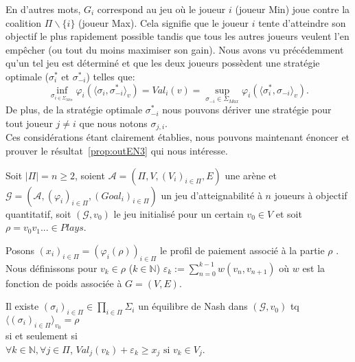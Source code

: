 En d'autres mots, $G_i$ correspond au jeu où le joueur $i$ (joueur Min) joue contre la coalition $\Pi\backslash\{ i \}$ (joueur Max). Cela signifie que le joueur $i$ tente d'atteindre son objectif le plus rapidement possible tandis que tous les autres joueurs veulent l'en empêcher (ou tout du moins maximiser son gain). Nous avons vu précédemment qu'un tel jeu est déterminé et que les deux joueurs possèdent une stratégie optimale ($\sigma^*_i$ et $\sigma^*_{-i}$) telles que:
$$ \inf_{\sigma _{i\in \Sigma _{Min}}} \varphi_i(\langle \sigma_i,\sigma^*_{-i}\rangle_v)= Val_i(v) = \sup _{\sigma_{-i}\in \Sigma_{Max}} \varphi_i(\langle \sigma^*_i, \sigma_{-i}\rangle_v).$$ De plus, de la stratégie optimale $\sigma^*_{-i}$ nous pouvons dériver une stratégie pour tout joueur $j \neq i$ que nous notons $\sigma_{j,i}$.\\

Ces considérations étant clairement établies, nous pouvons maintenant énoncer et prouver le résultat~\ref{prop:outEN3} qui nous intéresse.
\begin{propriete}
	\label{prop:outEN3}
	Soit $|\Pi| = n \geq 2$,
	soient $\mathcal{A} = (\Pi, V, (V_{i})_{i\in\Pi}, E)$ une arène et $\mathcal{G} = (\mathcal{A}, (\varphi _{i})_{i\in\Pi}, (Goal_{i})_{i\in\Pi})$ un jeu d'atteignabilité à $n$ joueurs à objectif quantitatif, soit $(\mathcal{G}, v_{0})$ le jeu initialisé pour un certain $v_{0} \in V $ et soit $\rho = v_{0}v_{1}... \in Plays$. 
	
	Posons $(x_{i})_{i\in\Pi} = (\varphi _{i}(\rho))_{i\in\Pi}$ le profil de paiement associé à la partie $\rho$ . Nous définissons pour $v_{k} \in \rho$ ($k \in \mathbb{N}$)  $\varepsilon _{k} := \sum _{n= 0} ^{k-1} w(v_{n},v_{n+1})$ où $w$ est la fonction de poids associée à $G = (V,E)$.
	
	\begin{center}Il existe $ (\sigma _{i})_{i\in\Pi} \in \prod_{i\in\Pi} \Sigma _{i}$ un équilibre de Nash dans $(\mathcal{G},v_{0})$ tq $\langle (\sigma _{i})_{i \in \Pi}\rangle_{v_0} = \rho$\\ $\text{}$\\ si et seulement si\\$\text{}$\\  $ \forall k \in \mathbb{N}, \forall j \in \Pi$, $Val_{j}(v_{k}) + \varepsilon _{k} \geq x_j \text{  si } v_{k} \in V_{j}$.\end{center}
	
\end{propriete}

\setcounter{equation}{0}

